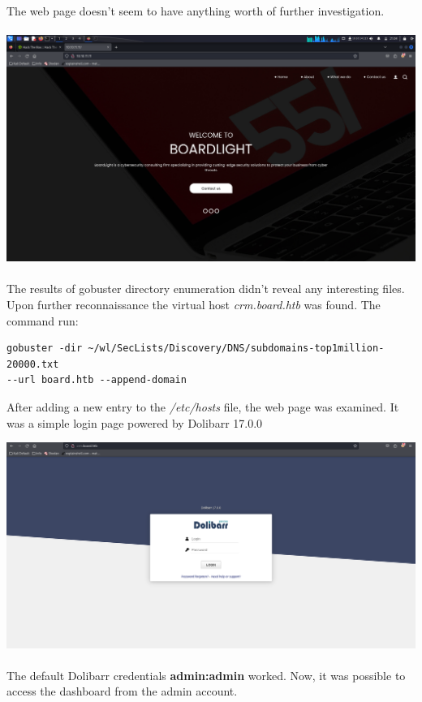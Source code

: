 \documentclass[12pt, letterpaper]{article}
\begin{document}
The web page doesn't seem to have anything worth of further investigation. \\\\

\includegraphics[width=\textwidth]{ boardlight-webpage.png } \\\\

The results of gobuster directory enumeration didn't reveal any interesting files.
Upon further reconnaissance the virtual host \textit{crm.board.htb} was found.
The command run:

\begin{verbatim}
gobuster -dir ~/wl/SecLists/Discovery/DNS/subdomains-top1million-20000.txt 
--url board.htb --append-domain
\end{verbatim}

After adding a new entry to the \textit{/etc/hosts} file, the web page was examined. 
It was a simple login page powered by Dolibarr 17.0.0

\includegraphics[width=\textwidth]{ login-page.png } \\\\

The default Dolibarr credentials \textbf{admin:admin} worked. Now, it was possible
to access the dashboard from the admin account.
\end{document}
